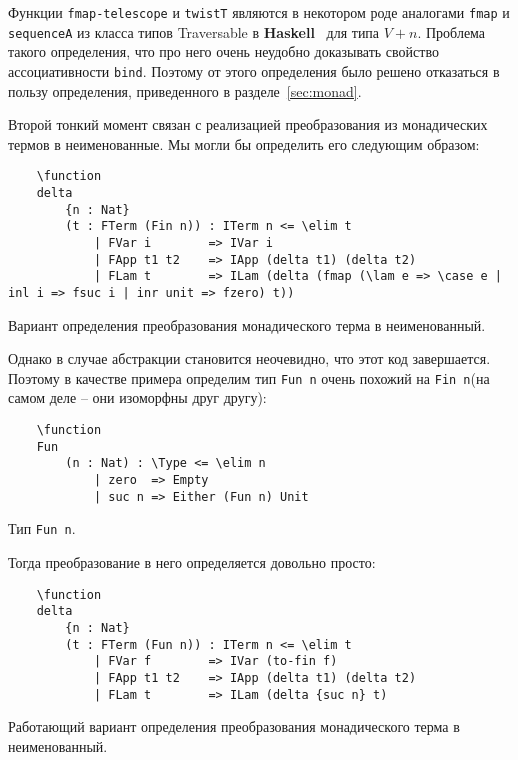 Функции \texttt{fmap-telescope} и \texttt{twistT} являются в некотором роде аналогами \texttt{fmap} и \texttt{sequenceA} из класса типов Traversable в \textbf{Haskell}~\cite{traversable} для типа $V + n$. Проблема такого определения, что про него очень неудобно доказывать свойство ассоциативности \texttt{bind}. Поэтому от этого определения было решено отказаться в пользу определения, приведенного в разделе~\ref{sec:monad}.

Второй тонкий момент связан с реализацией преобразования из монадических термов в неименованные. Мы могли бы определить его следующим образом:

\begin{listing}[H]
  \begin{verbatim}
    \function
    delta
        {n : Nat}
        (t : FTerm (Fin n)) : ITerm n <= \elim t
            | FVar i        => IVar i
            | FApp t1 t2    => IApp (delta t1) (delta t2)
            | FLam t        => ILam (delta (fmap (\lam e => \case e | inl i => fsuc i | inr unit => fzero) t))
  \end{verbatim}
  \caption{Вариант определения преобразования монадического терма в неименованный.}
\end{listing}

Однако в случае абстракции становится неочевидно, что этот код завершается. Поэтому в качестве примера определим тип \texttt{Fun n} очень похожий на \texttt{Fin n}(на самом деле -- они изоморфны друг другу):

\begin{listing}[H]
  \begin{verbatim}
    \function
    Fun
        (n : Nat) : \Type <= \elim n
            | zero  => Empty
            | suc n => Either (Fun n) Unit
  \end{verbatim}
  \caption{Тип \texttt{Fun n}.}
\end{listing}

Тогда преобразование в него определяется довольно просто:

\begin{listing}[H]
  \begin{verbatim}
    \function
    delta
        {n : Nat}
        (t : FTerm (Fun n)) : ITerm n <= \elim t
            | FVar f        => IVar (to-fin f)
            | FApp t1 t2    => IApp (delta t1) (delta t2)
            | FLam t        => ILam (delta {suc n} t)
  \end{verbatim}
  \caption{Работающий вариант определения преобразования монадического терма в неименованный.}
\end{listing}
